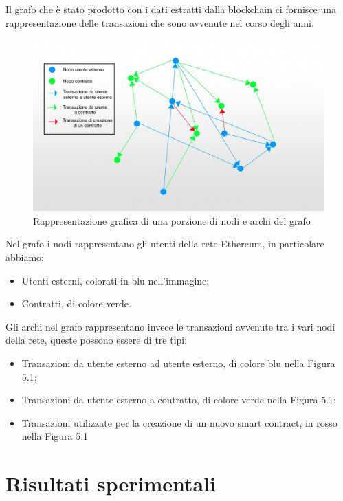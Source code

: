 \documentclass[12pt]{report}
\begin{document}
Il grafo che è stato prodotto con i dati estratti dalla blockchain ci fornisce una rappresentazione delle transazioni che sono avvenute nel corso degli anni.

\begin{figure}[H]
    \includegraphics[width=\textwidth]{GrafoFinito.jpg}
    \caption{Rappresentazione grafica di una porzione di nodi e archi del grafo}
\end{figure}

Nel grafo i nodi rappresentano gli utenti della rete Ethereum, in particolare abbiamo:

\begin{itemize}
    \item Utenti esterni, colorati in blu nell'immagine;
    \item Contratti, di colore verde.
\end{itemize}

Gli archi nel grafo rappresentano invece le transazioni avvenute tra i vari nodi della rete, queste possono essere di tre tipi:

\begin{itemize}
    \item Transazioni da utente esterno ad utente esterno, di colore blu nella Figura 5.1;
    \item Transazioni da utente esterno a contratto, di colore verde nella Figura 5.1;
    \item Transazioni utilizzate per la creazione di un nuovo smart contract, in rosso nella Figura 5.1
\end{itemize}

\chapter{Risultati sperimentali}
\end{document}

